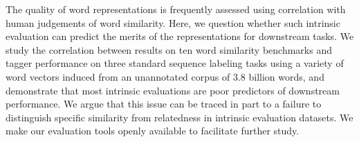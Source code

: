 The quality of word representations is frequently assessed using correlation with human judgements of word similarity. Here, we question whether such intrinsic evaluation can predict the merits of the representations for downstream tasks. We study the correlation between results on ten word similarity benchmarks and tagger performance on three standard sequence labeling tasks using a variety of word vectors induced from an unannotated corpus of 3.8 billion words, and demonstrate that most intrinsic evaluations are poor predictors of downstream performance. We argue that this issue can be traced in part to a failure to distinguish specific similarity from relatedness in intrinsic evaluation datasets. We make our evaluation tools openly available to facilitate further study.
